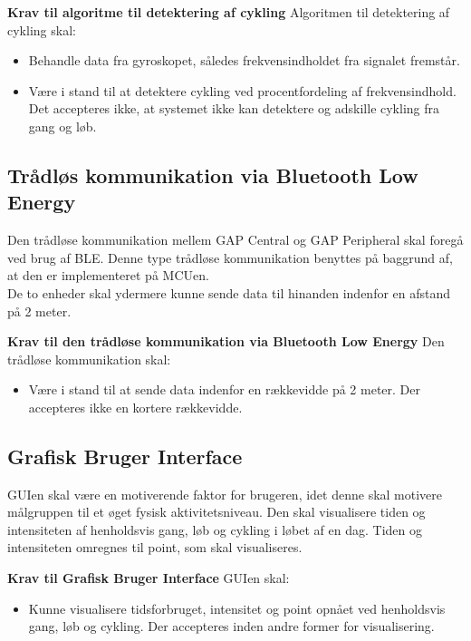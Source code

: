 \textbf{Krav til algoritme til detektering af cykling} \newline 
Algoritmen til detektering af cykling skal:
\begin{itemize}
	\item Behandle data fra gyroskopet, således frekvensindholdet fra signalet fremstår.
	\item Være i stand til at detektere cykling ved procentfordeling af frekvensindhold. Det accepteres ikke, at systemet ikke kan detektere og adskille cykling fra gang og løb.
\end{itemize}

\subsection{Trådløs kommunikation via Bluetooth Low Energy}\label{krav_BLE}
Den trådløse kommunikation mellem GAP Central og GAP Peripheral skal foregå ved brug af BLE. Denne type trådløse kommunikation benyttes på baggrund af, at den er implementeret på MCUen.\\
De to enheder skal ydermere kunne sende data til hinanden indenfor en afstand på 2 meter.  

\textbf{Krav til den trådløse kommunikation via Bluetooth Low Energy} \newline 
Den trådløse kommunikation skal:
\begin{itemize}
	\item Være i stand til at sende data indenfor en rækkevidde på 2 meter. Der accepteres ikke en kortere rækkevidde.
\end{itemize}

\subsection{Grafisk Bruger Interface}\label{krav_GUI}
GUIen skal være en motiverende faktor for brugeren, idet denne skal motivere målgruppen til et øget fysisk aktivitetsniveau. Den skal visualisere tiden og intensiteten af henholdsvis gang, løb og cykling i løbet af en dag. Tiden og intensiteten omregnes til point, som skal visualiseres.

\textbf{Krav til Grafisk Bruger Interface} \newline 
GUIen skal:
\begin{itemize}
	\item Kunne visualisere tidsforbruget, intensitet og point opnået ved henholdsvis gang, løb og cykling. Der accepteres inden andre former for visualisering.
\end{itemize}

